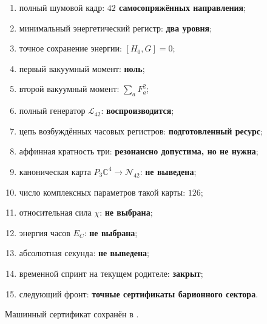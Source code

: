 \begin{protocol}
\begin{enumerate}
 \item полный шумовой кадр: \textbf{$42$ самосопряжённых направления};
 \item минимальный энергетический регистр: \textbf{два уровня};
 \item точное сохранение энергии: \textbf{$[H_0,G]=0$};
 \item первый вакуумный момент: \textbf{ноль};
 \item второй вакуумный момент: \textbf{$\sum_aF_a^2$};
 \item полный генератор $\mathcal L_{42}$: \textbf{воспроизводится};
 \item цепь возбуждённых часовых регистров: \textbf{подготовленный ресурс};
 \item аффинная кратность три: \textbf{резонансно допустима, но не нужна};
 \item каноническая карта $P_3\mathbb C^4\to\mathcal N_{42}$:
 \textbf{не выведена};
 \item число комплексных параметров такой карты: \textbf{$126$};
 \item относительная сила $\chi$: \textbf{не выбрана};
 \item энергия часов $E_C$: \textbf{не выбрана};
 \item абсолютная секунда: \textbf{не выведена};
 \item временной спринт на текущем родителе: \textbf{закрыт};
 \item следующий фронт: \textbf{точные сертификаты барионного сектора}.
\end{enumerate}
\end{protocol}

Машинный сертификат сохранён в
.